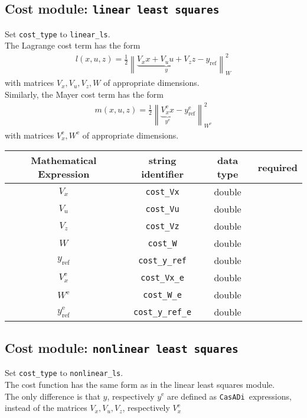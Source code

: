 \documentclass{article}
\newcommand{\code}[1]{\texttt{#1}}
\newcommand{\casadi}{\texttt{CasADi}}
\newcommand{\norm}[1]{\left\lVert#1\right\rVert}
\newcommand{\terminal}{^{\textrm{e}}}
\begin{document}
\subsection*{Cost module: \code{linear least squares}}
Set \code{cost\_type} to \code{linear\_ls}.\\
The Lagrange cost term has the form
\begin{align*}
l(x, u, z) = \frac{1}{2} \norm{ \underbrace{V_x x + V_u u + V_z z}_y - y_{\textrm{ref}}}_W^2
\end{align*}
with matrices $ V_x, V_u, V_z, W $ of appropriate dimensions.\\
Similarly, the Mayer cost term has the form
\begin{align*}
m(x, u, z) = \frac{1}{2} \norm{ \underbrace{V_x\terminal x}_{y\terminal} - y\terminal_{\textrm{ref}}}_{W\terminal}^2
\end{align*}
with matrices $ V\terminal_x, W\terminal $ of appropriate dimensions.
\begin{table}[h!]
	\centering
	\begin{tabular}{|c|c|c|c|}
		\toprule
		Mathematical Expression & string identifier & data type & required \\ \midrule
		$ V_x $ & \code{cost\_Vx}    & double & \mandatory   \\ \midrule
		$ V_u $ & \code{cost\_Vu}    & double & \mandatory   \\ \midrule
		$ V_z $ & \code{cost\_Vz}    & double & \mandatory  \\ \midrule
		$ W $ & \code{cost\_W}    & double & \mandatory  \\ \midrule
		$ y_{\textrm{ref}} $ & \code{cost\_y\_ref}    & double & \mandatory   \\ \midrule
		$ V_x\terminal $ & \code{cost\_Vx\_e}    & double  & \mandatory  \\ \midrule
		$ W\terminal $ & \code{cost\_W\_e}    & double & \mandatory   \\ \midrule
		$ y_{\textrm{ref}}\terminal $ & \code{cost\_y\_ref\_e}   & double & \mandatory   \\
		\bottomrule
	\end{tabular}
\end{table}

\newpage
\subsection*{Cost module: \code{nonlinear least squares}}
Set \code{cost\_type} to \code{nonlinear\_ls}.\\
The cost function has the same form as in the linear least squares module.\\
The only difference is that $ y $, respectively $ y\terminal $ are defined as \casadi~expressions, instead of the matrices $ V_x, V_u, V_z $, respectively $ V_x\terminal $
\end{document}
